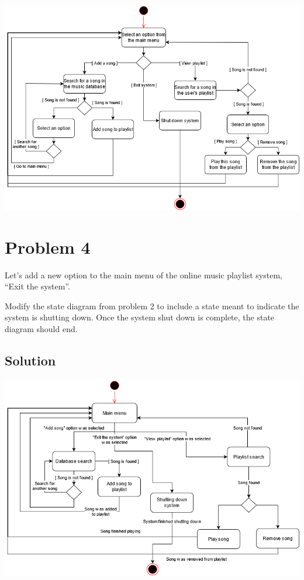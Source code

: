 \documentclass{article}
\begin{document}
    \begin{center}
        \includegraphics[scale=0.55]{Problem3.png}
    \end{center}



    \section*{Problem 4}

    Let’s add a new option to the main menu of the online music playlist system, “Exit the
    system”.

    Modify the state diagram from problem 2 to include a state meant to indicate the system
    is shutting down. Once the system shut down is complete, the state diagram should end.

    \subsection*{Solution}

    \begin{center}
        \includegraphics[scale=0.55]{Problem4.png}
    \end{center}
\end{document}
